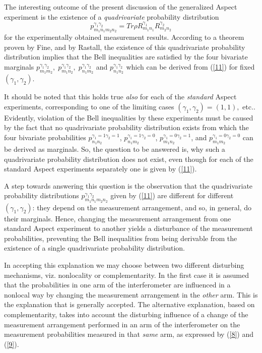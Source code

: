 \documentclass{ws-procs975x65}
\begin{document}
{The interesting outcome of the present discussion of the
generalized Aspect experiment is the existence of a
\textit{quadrivariate} probability distribution
 \begin{equation}\label{11}p^{\gamma_1\gamma_2}_{{m}_{\!1}
{n}_{\!1} {m}_{2} {n}_{2}} = Tr \rho R^{\gamma_1}_{{m}_{\!1}
n_{\!1}}
 {R}^{\gamma_2}_{ {m}_{2} {n}_{2}}
\end{equation}
for the experimentally obtained measurement results. According to
a theorem proven by Fine\cite{Fine}, and by Rastall\cite{Ras83},
the existence of this quadrivariate probability distribution
implies that the Bell inequalities are satisfied by the four
bivariate marginals $p^{\gamma_1\gamma_2}_{{m}_{\!1} {m}_{2}},\;
p^{\gamma_1\gamma_2}_{{m}_{\!1}  {n}_{2}},\;
p^{\gamma_1\gamma_2}_{{n}_{\!1} {m}_{2}}$ and
$p^{\gamma_1\gamma_2}_{{n}_{\!1}  {n}_{2}}$ which can be derived
from (\ref{11}) for fixed $(\gamma_1,\gamma_2)$.

It should be noted that this holds true \textit{also} for each of
the \textit{standard} Aspect experiments, corresponding to one of
the limiting cases $(\gamma_1, \gamma_2)=(1,1),$ etc.. Evidently,
violation of the Bell inequalities by these experiments must be
caused by the fact that no quadrivariate probability distribution
exists from which the four bivariate probabilities
$p^{\gamma_1=1\gamma_2=1}_{{n}_{\!1} {n}_{2}}$,
$p^{\gamma_1=1\gamma_2=0}_{{n}_{\!1} {m}_{2}}$,
$p^{\gamma_1=0\gamma_2=1}_{{m}_{\!1} {n}_{2}}$,
 and $p^{\gamma_1=0\gamma_2=0}_{{m}_{\!1} {m}_{2}}$
 can be derived as marginals. So, the question to be answered is,
 why such a quadrivariate probability distribution does not exist,
 even though for each of the standard Aspect experiments separately
 one is given by (\ref{11}).

A step towards answering this question is the observation that the
quadrivariate probability distributions
$p^{\gamma_1\gamma_2}_{{m}_{\!1} {n}_{\!1} {m}_{2} {n}_{2}}$ given
by (\ref{11}) are different for different $(\gamma_1,\gamma_2)$:
they depend on the measurement arrangement, and so, in general, do
their marginals. Hence, changing the measurement arrangement from
one standard Aspect experiment to another yields a disturbance of
the measurement probabilities, preventing the Bell inequalities
from being derivable from the existence of a single quadrivariate
probability distribution.

In accepting this explanation we may choose between two different
disturbing mechanisms, viz. nonlocality or complementarity. In the
first case it is assumed that the probabilities in one arm of the
interferometer are influenced in a nonlocal way by changing the
measurement arrangement in the \textit{other} arm. This is the
explanation that is generally accepted. The alternative
explanation, based on complementarity, takes into account the
disturbing influence of a change of the measurement arrangement
performed in an arm of the interferometer on the measurement
probabilities measured in that \textit{same} arm, as expressed by
(\ref{8}) and (\ref{9}).

}
\end{document}

